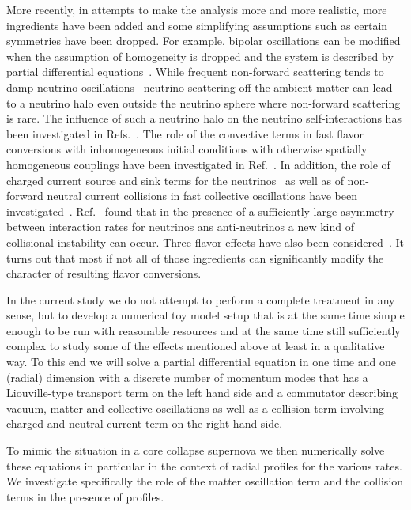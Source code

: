 \documentclass[prd,aps]{revtex4-2}
\begin{document}
More recently, in attempts to make the analysis more and more realistic, more ingredients have been added and
some simplifying assumptions such as certain symmetries have been dropped. For example, bipolar oscillations can be
modified when the assumption of homogeneity is dropped and the system is described by partial differential 
equations~\cite{Mangano:2014zda}. While frequent non-forward scattering tends to damp neutrino oscillations~\cite{Stodolsky:1986dx}
neutrino scattering off the ambient matter can lead to a neutrino halo even outside the neutrino sphere where non-forward
scattering is rare. The influence of such a neutrino halo on the neutrino self-interactions
has been investigated in Refs.~\cite{Cherry:2012zw,Sarikas:2012vb}. The role of the convective terms in fast flavor
conversions with inhomogeneous initial conditions with otherwise spatially homogeneous couplings have been investigated in 
Ref.~\cite{Shalgar:2019qwg}. In addition, the role of charged current
source and sink terms for the neutrinos~\cite{Cirigliano:2017hmk,Capozzi:2018clo} as well as of non-forward neutral current collisions
in fast collective oscillations have been investigated~\cite{Shalgar:2020wcx,Martin:2021xyl}. Ref.~\cite{Johns:2021qby} found that
in the presence of a sufficiently large asymmetry between interaction rates for neutrinos ans anti-neutrinos a new kind
of collisional instability can occur. Three-flavor effects have also been considered~\cite{Shalgar:2021wlj}.
It turns out that most if not all of those ingredients can significantly modify the character of resulting flavor conversions.

In the current study we do not attempt to perform a complete treatment in any sense, but to develop a numerical toy
model setup that is at the same time simple enough to be run with reasonable resources and at the same time still
sufficiently complex to study some of the effects mentioned above at least in a qualitative way. To this end we will
solve a partial differential equation in one time and one (radial) dimension with a discrete number of momentum modes
that has a Liouville-type transport term on
the left hand side and a commutator describing vacuum, matter and collective oscillations as well as a collision term
involving charged and neutral current term on the right hand side.

To mimic the situation in a core collapse supernova we then numerically solve these equations in particular in the
context of radial profiles for the various rates. We investigate specifically the role of the matter oscillation term
and the collision terms in the presence of profiles.
\end{document}
